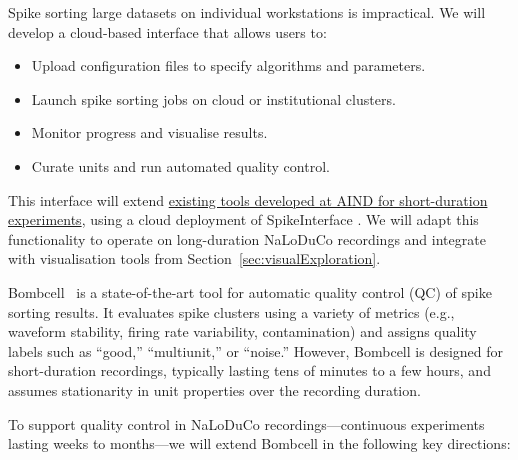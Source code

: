 \label{sec:offlineMethodsCloud}

Spike sorting large datasets on individual workstations is impractical. We will develop a cloud-based interface that allows users to:

\begin{itemize}
    \item Upload configuration files to specify algorithms and parameters.
    \item Launch spike sorting jobs on cloud or institutional clusters.
    \item Monitor progress and visualise results.
    \item Curate units and run automated quality control.
\end{itemize}

This interface will extend
\href{https://www.youtube.com/watch?v=F652nwcdYSE&list=PLQVnU1OJzOn_mFlUL8aWQym4HfVvhlrGE&index=28&t=20s}{existing
tools developed at AIND for short-duration experiments}, using a cloud
deployment of SpikeInterface \citep{buccinoEtAl20}. We will adapt this
functionality to operate on long-duration NaLoDuCo recordings and integrate
with visualisation tools from Section~\ref{sec:visualExploration}.

\label{sec:offlineQC}



Bombcell~\citep{fabreEtAl23} is a state-of-the-art tool for automatic quality control (QC) of spike sorting results. It evaluates spike clusters using a variety of metrics (e.g., waveform stability, firing rate variability, contamination) and assigns quality labels such as ``good,'' ``multiunit,'' or ``noise.'' However, Bombcell is designed for short-duration recordings, typically lasting tens of minutes to a few hours, and assumes stationarity in unit properties over the recording duration.

To support quality control in NaLoDuCo recordings—continuous experiments lasting weeks to months—we will extend Bombcell in the following key directions:

